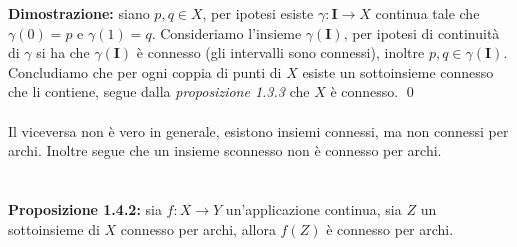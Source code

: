 \documentclass{article}
\begin{document}
\textbf{Dimostrazione:} siano $p, q \in X$, per ipotesi esiste $\gamma : \mathbf{I} \longrightarrow X$ continua tale che $\gamma(0) = p$ e $\gamma(1) = q$. Consideriamo l'insieme $\gamma(\mathbf{I})$, per ipotesi di continuità di $\gamma$ si ha che $\gamma(\mathbf{I})$ è connesso (gli intervalli sono connessi), inoltre $p, q \in \gamma(\mathbf{I})$. Concludiamo che per ogni coppia di punti di $X$ esiste un sottoinsieme connesso che li contiene, segue dalla \textit{proposizione 1.3.3} che $X$ è connesso. \qed \\ \\
Il viceversa non è vero in generale, esistono insiemi connessi, ma non connessi per archi. Inoltre segue che un insieme sconnesso non è connesso per archi. \\ \\ \\
\textbf{Proposizione 1.4.2:} sia $f : X \longrightarrow Y$ un'applicazione continua, sia $Z$ un sottoinsieme di $X$ connesso per archi, allora $f(Z)$ è connesso per archi. \\ 
\end{document}
